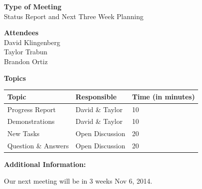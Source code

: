 \documentclass[pdftex,11pt]{article}
\begin{document}
{ \large \bfseries \hspace*{2 mm} Type of Meeting\\}
\hspace*{12 mm}  Status Report and  Next Three Week Planning
\vspace*{1.5mm}

{ \large \bfseries \hspace*{2 mm} Attendees\\}
\hspace*{12mm} David Klingenberg\\
\hspace*{12mm} Taylor Trabun\\
\hspace*{12mm} Brandon Ortiz\\
\vspace*{1.5mm}

{ \large \bfseries \noindent Topics}
\vspace*{2.5mm}

\begin{tabular}{| l | l | l |}
  \hline
  \bfseries Topic & \bfseries Responsible & \bfseries Time (in minutes) \\ \hline
  Progress Report  & David \& Taylor &  10 \\ \hline
  Demonstrations & David \& Taylor & 10 \\ \hline
  New Tasks & Open Discussion & 20 \\ \hline
  Question \&  Answers  & Open Discussion & 20 \\ 
  \hline
\end{tabular}

\vspace*{2.5mm}
{ \large \bfseries \noindent Additional Information:}

Our next meeting will be in 3 weeks Nov 6, 2014.
\end{document}
